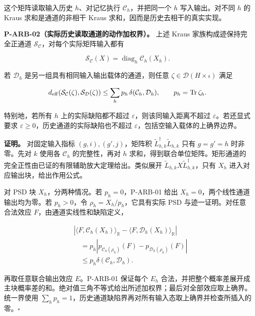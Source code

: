 \documentclass[
  11pt,
  oneside]{book}
\begin{document}
这个矩阵读取输入历史 \(h\)、对记忆执行 \(\mathcal C_h\)，并把同一个
\(h\) 写入输出。对不同 \(h\) 的 Kraus 求和是通道的非相干 Kraus
求和，因而是历史去相干的真实实现。

\protect\hypertarget{p-arb-02}{}{}

\textbf{P-ARB-02（实际历史读取通道的动作加权界）。} 上述 Kraus
家族构成迹保持完全正通道
\(\mathcal S_{\mathcal C}\)，对每个实际矩阵输入都有

\[
\mathcal S_{\mathcal C}(X)
=\operatorname{diag}_h\mathcal C_h(X_h).
\]

若 \(\mathcal D_h\) 是另一组具有相同输入输出载体的通道，则任意
\(\zeta\in\mathcal D(H\times\iota)\) 满足

\[
d_{\rm eff}(\mathcal S_{\mathcal C}(\zeta),
             \mathcal S_{\mathcal D}(\zeta))
\le \sum_h p_h\,\delta(\mathcal C_h,\mathcal D_h),
\qquad p_h=\operatorname{Tr}\zeta_h.
\]

特别地，若所有 \(h\) 上的实际缺陷都不超过
\(\varepsilon\)，则该同输入距离不超过 \(\varepsilon\)。若还显式要求
\(\varepsilon\ge0\)，历史通道的实际缺陷也不超过
\(\varepsilon\)，包括空输入载体的上确界边界。

\textbf{证明。} 对固定输入指标 \((g,i),(g',j)\)，矩阵积
\(\widetilde L_{h,k}^\dagger\widetilde L_{h,k}\) 只有 \(g=g'=h\)
时非零。先对 \(k\) 使用各 \(\mathcal C_h\) 的完整性，再对 \(h\)
求和，得到联合单位矩阵。矩形通道的完全正性由已证的有限辅助放大定理给出。类似展开
\(\widetilde L_{h,k}X\widetilde L_{h,k}^\dagger\)，只有 \(X_h\)
进入对应输出块，给出作用公式。

对 PSD 块 \(X_h\)，分两种情况。若 \(p_h=0\)，P-ARB-01 给出
\(X_h=0\)，两个线性通道输出均为零。若 \(p_h>0\)，令
\(\rho_h=X_h/p_h\)，它具有实际 PSD 与迹一证明。对任意合法效应
\(F\)，由通道实线性和缺陷定义，

\[
\begin{aligned}
&\left|\langle F,\mathcal C_h(X_h)\rangle_{\mathbb R}
 -\langle F,\mathcal D_h(X_h)\rangle_{\mathbb R}\right|\\
&\quad=p_h\left|p_{\mathcal C_h(\rho_h)}(F)
                 -p_{\mathcal D_h(\rho_h)}(F)\right|\\
&\quad\le p_h\delta(\mathcal C_h,\mathcal D_h).
\end{aligned}
\]

再取任意联合输出效应 \(E\)。P-ARB-01 保证每个 \(E_h\)
合法，并把整个概率差展开成主块概率差的和。绝对值三角不等式给出所述加权界；最后对全部效应取上确界。统一界使用
\(\sum_hp_h=1\)，历史通道缺陷界再对所有输入态取上确界并检查所插入的零。\(\square\)
\end{document}

